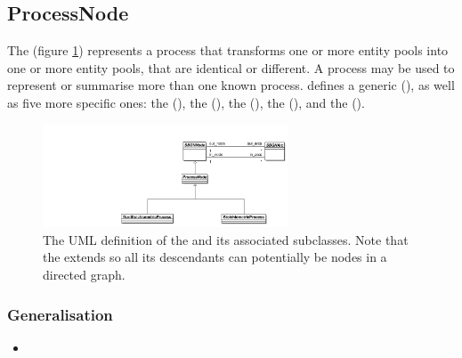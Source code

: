 
\subsection{ProcessNode}\label{sec:PNs}
\label{defn:ProcessNode}

The  (figure \ref{fig:processumlview}) represents a process that transforms one or
more entity pools into one or more entity pools, that are identical or
different. A process may be used to represent or summarise more than
one known process.  \SBGNPDLone defines a generic 
(), as well as five more specific ones: the
 (), the  (), the 
(), the  (),
and the  ().

\begin{figure}[htb]
  \centering
  \includegraphics[width = 0.65\textwidth]{images/processumlview}
  \caption{The UML definition of the  and its
    associated subclasses. Note that the  extends
     so all its descendants can potentially be
    nodes in a directed graph.}
  \label{fig:processumlview}
\end{figure}


\subsubsection{Generalisation}

\begin{itemize}
\item {}
\end{itemize}

